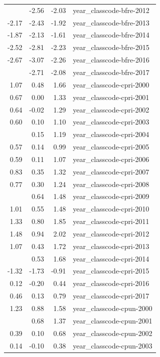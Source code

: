 \documentclass[]{article}
\begin{document}
\begin{longtable}[t]{rrrl}
\addlinespace
-2.30 & -2.56 & -2.03 & year\_classcode-bfre-2012\\
-2.17 & -2.43 & -1.92 & year\_classcode-bfre-2013\\
-1.87 & -2.13 & -1.61 & year\_classcode-bfre-2014\\
-2.52 & -2.81 & -2.23 & year\_classcode-bfre-2015\\
-2.67 & -3.07 & -2.26 & year\_classcode-bfre-2016\\
\addlinespace
-2.39 & -2.71 & -2.08 & year\_classcode-bfre-2017\\
1.07 & 0.48 & 1.66 & year\_classcode-cpri-2000\\
0.67 & 0.00 & 1.33 & year\_classcode-cpri-2001\\
0.64 & -0.02 & 1.29 & year\_classcode-cpri-2002\\
0.60 & 0.10 & 1.10 & year\_classcode-cpri-2003\\
\addlinespace
0.67 & 0.15 & 1.19 & year\_classcode-cpri-2004\\
0.57 & 0.14 & 0.99 & year\_classcode-cpri-2005\\
0.59 & 0.11 & 1.07 & year\_classcode-cpri-2006\\
0.83 & 0.35 & 1.32 & year\_classcode-cpri-2007\\
0.77 & 0.30 & 1.24 & year\_classcode-cpri-2008\\
\addlinespace
1.06 & 0.64 & 1.48 & year\_classcode-cpri-2009\\
1.01 & 0.55 & 1.48 & year\_classcode-cpri-2010\\
1.33 & 0.80 & 1.85 & year\_classcode-cpri-2011\\
1.48 & 0.94 & 2.02 & year\_classcode-cpri-2012\\
1.07 & 0.43 & 1.72 & year\_classcode-cpri-2013\\
\addlinespace
1.10 & 0.53 & 1.68 & year\_classcode-cpri-2014\\
-1.32 & -1.73 & -0.91 & year\_classcode-cpri-2015\\
0.12 & -0.20 & 0.44 & year\_classcode-cpri-2016\\
0.46 & 0.13 & 0.79 & year\_classcode-cpri-2017\\
1.23 & 0.88 & 1.58 & year\_classcode-cpun-2000\\
\addlinespace
1.02 & 0.68 & 1.37 & year\_classcode-cpun-2001\\
0.39 & 0.10 & 0.68 & year\_classcode-cpun-2002\\
0.14 & -0.10 & 0.38 & year\_classcode-cpun-2003\\

\end{longtable}
\end{document}
